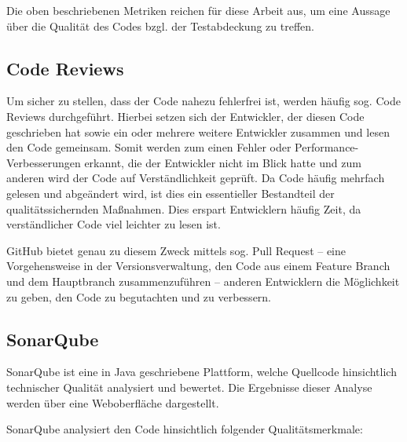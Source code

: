				Die oben beschriebenen Metriken reichen für diese Arbeit aus, um eine Aussage über die Qualität des Codes bzgl. der Testabdeckung zu treffen. 
				
		\subsection{Code Reviews}
		
			Um sicher zu stellen, dass der Code nahezu fehlerfrei ist, werden häufig sog. Code Reviews durchgeführt. Hierbei setzen sich der Entwickler, der diesen Code geschrieben hat sowie ein oder mehrere weitere Entwickler zusammen und lesen den Code gemeinsam. Somit werden zum einen Fehler oder Performance-Verbesserungen erkannt, die der Entwickler nicht im Blick hatte und zum anderen wird der Code auf Verständlichkeit geprüft. Da Code häufig mehrfach gelesen und abgeändert wird, ist dies ein essentieller Bestandteil der qualitätssichernden Maßnahmen. Dies erspart Entwicklern häufig Zeit, da verständlicher Code viel leichter zu lesen ist.
			
			GitHub bietet genau zu diesem Zweck mittels sog. Pull Request -- eine Vorgehensweise in der Versionsverwaltung, den Code aus einem Feature Branch und dem Hauptbranch zusammenzuführen -- anderen Entwicklern die Möglichkeit zu geben, den Code zu begutachten und zu verbessern.			
		
		\subsection{SonarQube}
		\label{qm.sonarqube}
		
			SonarQube ist eine in Java geschriebene Plattform, welche Quellcode hinsichtlich technischer Qualität analysiert und bewertet. Die Ergebnisse dieser Analyse werden über eine Weboberfläche dargestellt. \cite{A.2142020} 
			
			SonarQube analysiert den Code hinsichtlich folgender Qualitätsmerkmale:
			
